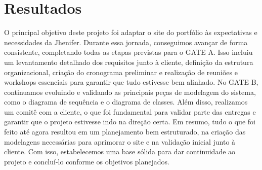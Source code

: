 \chapter{Resultados}
\label{chap:result}
O principal objetivo deste projeto foi adaptar o site do portfólio às expectativas e
 necessidades da Jhenifer. Durante essa jornada, conseguimos avançar de forma
 consistente, completando todas as etapas previstas para o GATE A. Isso incluiu um
 levantamento detalhado dos requisitos junto à cliente, definição da estrutura
 organizacional, criação do cronograma preliminar e realização de reuniões e workshops
 essenciais para garantir que tudo estivesse bem alinhado.
 No GATE B, continuamos evoluindo e validando as principais peças de modelagem do
 sistema, como o diagrama de sequência e o diagrama de classes. Além disso, realizamos
 um comitê com a cliente, o que foi fundamental para validar parte das entregas e garantir
 que o projeto estivesse indo na direção certa.
 Em resumo, tudo o que foi feito até agora resultou em um planejamento bem estruturado,
 na criação das modelagens necessárias para aprimorar o site e na validação inicial junto à
 cliente. Com isso, estabelecemos uma base sólida para dar continuidade ao projeto e
 concluí-lo conforme os objetivos planejados.



